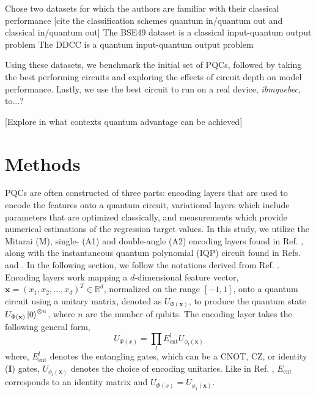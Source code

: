 \documentclass[journal=jacsat,manuscript=article]{achemso}
\begin{document}
Chose two datasets for which the authors are familiar with their classical performance
[cite the classification schemes quantum in/quantum out and classical in/quantum out]
The BSE49 dataset is a classical input-quantum output problem
The DDCC is a quantum input-quantum output problem

Using these datasets, we benchmark the initial set of PQCs, followed by taking the best performing circuits and exploring the effects of circuit depth on model performance.
Lastly, we use the best circuit to run on a real device, \textit{ibm\textunderscore quebec}, to...?


[Explore in what contexts quantum advantage can be achieved]

\section{Methods}
PQCs are often constructed of three parts: encoding layers that are used to encode the features onto a quantum circuit, variational layers which include parameters that are optimized classically, and measurements which provide numerical estimations of the regression target values.\citep{suzuki_predicting_2020} 
In this study, we utilize the Mitarai (M)\cite{mitarai_quantum_2018}, single- (A1) and double-angle (A2) encoding layers found in Ref. \citep{suzuki_predicting_2020}, along with the instantaneous quantum polynomial (IQP) circuit found in Refs. \citep{bremner_average-case_2016} and \citep{havlicek_supervised_2019}.
In the following section, we follow the notations derived from  Ref. \citep{suzuki_predicting_2020}.
Encoding layers work mapping a $d$-dimensional feature vector, $\mathbf{x}=(x_{1}, x_{2}, \ldots, x_{d})^{T} \in \mathbb{R}^{d}$, normalized on the range $[-1,1]$, onto a quantum circuit using a unitary matrix, denoted as $U_{\Phi(\mathbf{x})}$, to produce the quantum state $U_{\Phi(\mathbf{x})}\ket{0}^{\otimes n}$, where $n$ are the number of qubits.
The encoding layer takes the following general form,
\begin{equation}
	U_{\Phi(x)} =  \prod_{l} E_{\text{ent}}^{l} U_{\phi_{l}(\mathbf{x})}
	\label{eq:general_encoding}
\end{equation}
where, $E_{\text{ent}}^{l}$ denotes the entangling gates, which can be a CNOT, CZ, or identity ($\mathbf{I}$) gates,   $U_{\phi_{l}(\mathbf{x})}$ denotes the choice of encoding unitaries. 
Like in  Ref. \citep{suzuki_predicting_2020}, $E_{\text{ent}}$ corresponds to an identity matrix and $U_{\Phi(x)} = U_{\phi_{1}(\mathbf{x})}$.
\end{document}

